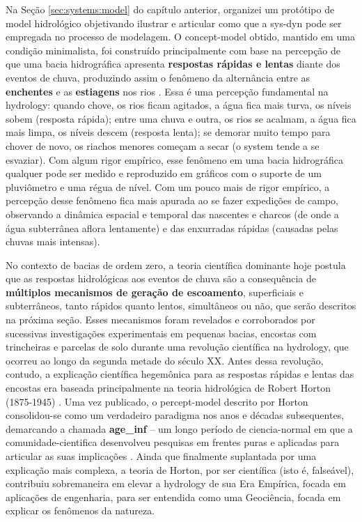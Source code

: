 \documentclass[./main.tex]{subfiles}
\begin{document}
\par Na Seção \ref{sec:systems:model} do capítulo anterior, organizei um protótipo de \gls{model} hidrológico objetivando ilustrar e articular como que a \gls{sys-dyn} pode ser empregada no processo de modelagem. O \gls{concept-model} obtido, mantido em uma condição minimalista, foi construído principalmente com base na percepção de que uma bacia hidrográfica apresenta \textbf{respostas rápidas e lentas} diante dos eventos de chuva, produzindo assim o fenômeno da alternância entre as \textbf{enchentes} e as \textbf{estiagens} nos rios \cite{Hewlett1967}. Essa é uma percepção fundamental na \gls{hydrology}: quando chove, os rios ficam agitados, a água fica mais turva, os níveis sobem (resposta rápida); entre uma chuva e outra, os rios se acalmam, a água fica mais limpa, os níveis descem (resposta lenta); se demorar muito tempo para chover de novo, os riachos menores começam a secar (o \gls{system} tende a se esvaziar). Com algum rigor empírico, esse fenômeno em uma bacia hidrográfica qualquer pode ser medido e reproduzido em gráficos com o suporte de um pluviômetro e uma régua de nível. Com um pouco mais de rigor empírico, a percepção desse fenômeno fica mais apurada ao se fazer expedições de campo, observando a dinâmica espacial e temporal das nascentes e charcos (de onde a água subterrânea aflora lentamente) e das enxurradas rápidas (causadas pelas chuvas mais intensas). 

\par No contexto de bacias de ordem zero, a \gls{teoria} científica dominante hoje postula que as respostas hidrológicas aos eventos de chuva são a consequência de \textbf{múltiplos mecanismos de geração de escoamento}, superficiais e subterrâneos, tanto rápidos quanto lentos, simultâneos ou não, que serão descritos na próxima seção. Esses mecanismos foram revelados e corroborados por sucessivas investigações experimentais em pequenas bacias, encostas com trincheiras e parcelas de solo durante uma revolução científica na \gls{hydrology}, que ocorreu ao longo da segunda metade do século XX. Antes dessa revolução, contudo, a explicação científica hegemônica para as respostas rápidas e lentas das encostas era baseada principalmente na \gls{teoria} hidrológica de Robert Horton (1875-1945) \cite{Horton1933, Beven2004a}. Uma vez publicado, o \gls{percept-model} descrito por Horton consolidou-se como um verdadeiro \gls{paradigma} nos anos e décadas subsequentes, demarcando a chamada \textbf{\gls{age_inf}} -- um longo período de \gls{ciencia-normal} em que a \gls{comunidade-cientifica} desenvolveu pesquisas em frentes puras e aplicadas para articular as suas implicações \cite{Cook1946, Beven2021b}. Ainda que finalmente suplantada por uma explicação mais complexa, a \gls{teoria} de Horton, por ser científica (isto é, falseável), contribuiu sobremaneira em elevar a \gls{hydrology} de sua Era Empírica, focada em aplicações de engenharia, para ser entendida como uma Geociência, focada em explicar os fenômenos da natureza.
\end{document}
